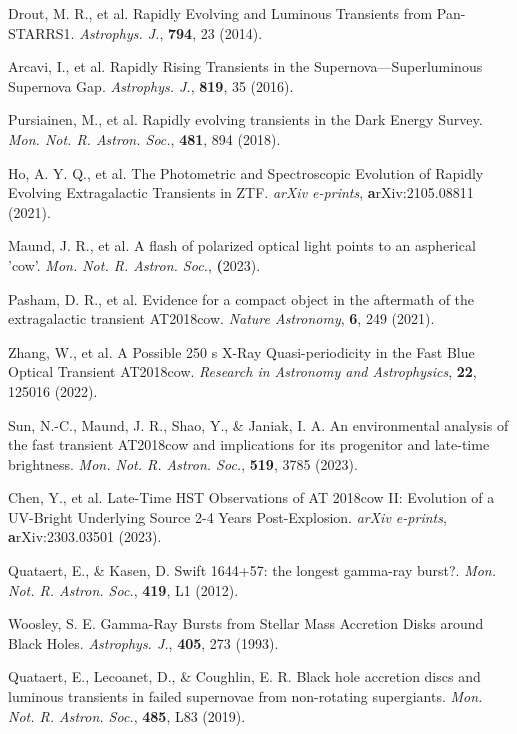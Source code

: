 \documentclass{nature_plusfigure}
\newcommand{\mn}{{Mon. Not. R. Astron. Soc.}}
\newcommand{\mnras}{\mn}
\newcommand{\apj}{{Astrophys. J.}}
\begin{document}
\begin{thebibliography}{100}

 Drout, M. R., et al. Rapidly Evolving and Luminous Transients from Pan-STARRS1. \emph{\apj}, \textbf{794}, 23 (2014). 

 Arcavi, I., et al. Rapidly Rising Transients in the Supernova—Superluminous Supernova Gap. \emph{\apj}, \textbf{819}, 35 (2016). 

 Pursiainen, M., et al. Rapidly evolving transients in the Dark Energy Survey. \emph{\mnras}, \textbf{481}, 894 (2018). 

 Ho, A. Y. Q., et al. The Photometric and Spectroscopic Evolution of Rapidly Evolving Extragalactic Transients in ZTF. \emph{arXiv e-prints}, \textbf arXiv:2105.08811 (2021). 

 Maund, J. R., et al. A flash of polarized optical light points to an aspherical 'cow'. \emph{\mnras}, \textbf (2023). 

 Pasham, D. R., et al. Evidence for a compact object in the aftermath of the extragalactic transient AT2018cow. \emph{Nature Astronomy}, \textbf{6}, 249 (2021). 

 Zhang, W., et al. A Possible 250 s X-Ray Quasi-periodicity in the Fast Blue Optical Transient AT2018cow. \emph{Research in Astronomy and Astrophysics}, \textbf{22}, 125016 (2022). 

 Sun, N.-C., Maund, J. R., Shao, Y., \& Janiak, I. A. An environmental analysis of the fast transient AT2018cow and implications for its progenitor and late-time brightness. \emph{\mnras}, \textbf{519}, 3785 (2023). 

 Chen, Y., et al. Late-Time HST Observations of AT 2018cow II: Evolution of a UV-Bright Underlying Source 2-4 Years Post-Explosion. \emph{arXiv e-prints}, \textbf arXiv:2303.03501 (2023). 


 Quataert, E., \& Kasen, D. Swift 1644+57: the longest gamma-ray burst?. \emph{\mnras}, \textbf{419}, L1 (2012). 

 Woosley, S. E. Gamma-Ray Bursts from Stellar Mass Accretion Disks around Black Holes. \emph{\apj}, \textbf{405}, 273 (1993). 

  Quataert, E., Lecoanet, D., \& Coughlin, E. R. Black hole accretion discs and luminous transients in failed supernovae from non-rotating supergiants. \emph{\mnras}, \textbf{485}, L83 (2019). 


\end{thebibliography}
\end{document}
